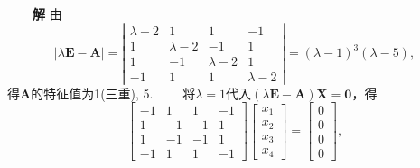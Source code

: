 \documentclass[compress,mathserif,cjk]{beamer}
\theoremstyle{remark}
\numberwithin{equation}{section}
\newcommand{\hei}{\bf}      %
\begin{document}
\begin{CJK}{UTF8}{gbsn}
\begin{frame}
\pause\vskip 2pt
\ \ \ \ {\hei 解} 由
$$|\lambda\bm E-\bm A|=\left|\begin{matrix}\lambda-2&1&1&-1\\1&\lambda-2&-1&1\\1&-1&\lambda-2&1\\-1&1&1&\lambda-2\end{matrix}\right|=(\lambda-1)^3(\lambda-5),$$
得$\bm A$的特征值为1(三重), 5.
\pause\vskip 2pt
\ \ \ \ 将$\lambda=1$代入$(\lambda\bm E-\bm A)\bm X=\bm0$，得
$$\left[\begin{matrix}-1&1&1&-1\\1&-1&-1&1\\1&-1&-1&1\\-1&1&1&-1\end{matrix}\right]\left[\begin{matrix}x_1\\x_2\\x_3\\x_4\end{matrix}\right]
=\left[\begin{matrix}0\\0\\0\\0\end{matrix}\right],$$
\end{frame}


\end{CJK}
\end{document}
